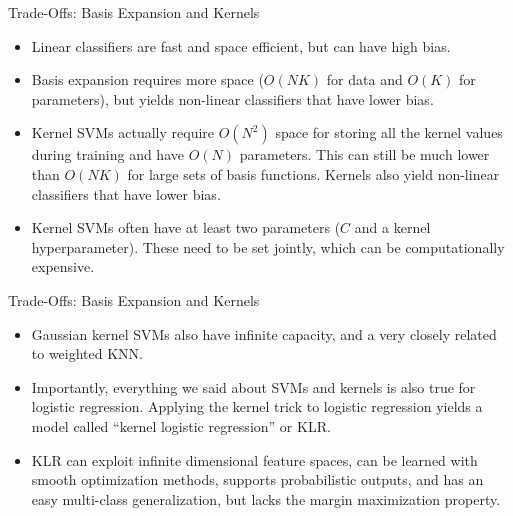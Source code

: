 \documentclass[serif,xcolor=pdftex,dvipsnames,table,hyperref={bookmarks=false}]{beamer}
\begin{document}
\begin{frame}[t]{Trade-Offs: Basis Expansion and Kernels}

\begin{itemize}
\setlength{\itemsep}{8pt}
\item Linear classifiers are fast and space efficient, but can have high bias.

\pause \item Basis expansion requires more space ($O(NK)$ for data and $O(K)$ for parameters), but yields non-linear classifiers that have lower bias.

\pause \item Kernel SVMs actually require $O(N^2)$ space for storing all the kernel values during training and have $O(N)$ parameters. This can still be much lower than $O(NK)$ for large sets of basis functions. Kernels also yield non-linear classifiers that have lower bias.

\pause\item Kernel SVMs often have at least two parameters ($C$ and a kernel hyperparameter). These need to be set jointly, which can be computationally expensive. 

\end{itemize}
\end{frame}

\begin{frame}[t]{Trade-Offs: Basis Expansion and Kernels}

\begin{itemize}
\setlength{\itemsep}{8pt}

\item Gaussian kernel SVMs also have infinite capacity, and a very closely related to weighted KNN.

\pause\item Importantly, everything we said about SVMs and kernels is also true for logistic regression. Applying the kernel trick to logistic regression yields a model called ``kernel logistic regression'' or KLR.

\pause\item KLR can exploit infinite dimensional feature spaces, can be learned with smooth optimization methods, supports probabilistic outputs, and has an easy multi-class generalization, but lacks the margin maximization property. 

\end{itemize}
\end{frame}
\end{document}
